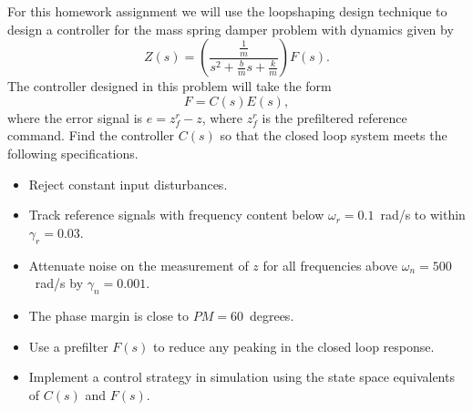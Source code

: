 For this homework assignment we will use the loopshaping design technique to design a controller for the mass spring damper problem with dynamics given by 
\[
Z(s) = \left(\frac{\frac{1}{m}}{s^2 + \frac{b}{m}s + \frac{k}{m}}\right) F(s).
\]
The controller designed in this problem will take the form
\[
	F = C(s)E(s),
\]
where the error signal is $e=z^r_f - z$, where $z^r_f$ is the prefiltered reference command.
Find the controller $C(s)$ so that the closed loop system meets the following specifications.
\begin{itemize}
	\item Reject constant input disturbances.
	\item Track reference signals with frequency content below $\omega_r=0.1$~rad/s to within $\gamma_r=0.03$.
	  \item Attenuate noise on the measurement of $z$ for all frequencies above $\omega_n=500$~rad/s by $\gamma_n=0.001$.
	  \item The phase margin is close to $PM=60$~degrees.
	\item Use a prefilter $F(s)$ to reduce any peaking in the closed loop response.
	\item Implement a control strategy in simulation using the state space equivalents of $C(s)$ and $F(s)$.
\end{itemize}
